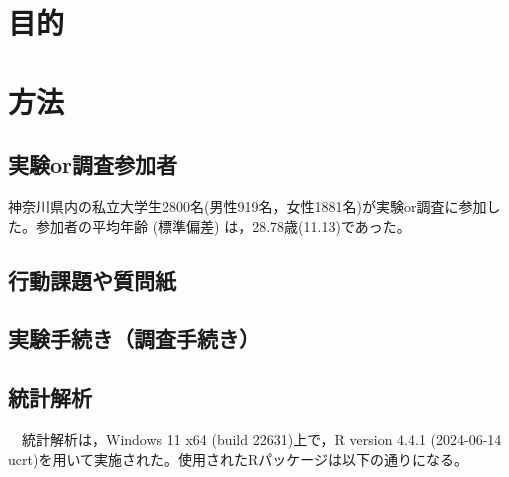 \documentclass[12pt,a4paper,xelatex,ja=standard]{bxjsarticle}
\begin{document}
\section{目的}\label{ux76eeux7684}

\clearpage

\section{方法}\label{ux65b9ux6cd5}

\subsection{実験or調査参加者}\label{ux5b9fux9a13orux8abfux67fbux53c2ux52a0ux8005}

神奈川県内の私立大学生2800名(男性919名，女性1881名)が実験or調査に参加した。参加者の平均年齢
(標準偏差) は，28.78歳(11.13)であった。

\subsection{行動課題や質問紙}\label{ux884cux52d5ux8ab2ux984cux3084ux8ceaux554fux7d19}

\subsection{実験手続き（調査手続き）}\label{ux5b9fux9a13ux624bux7d9aux304dux8abfux67fbux624bux7d9aux304d}

\subsection{統計解析}\label{ux7d71ux8a08ux89e3ux6790}

　統計解析は，Windows 11 x64 (build 22631)上で，R version 4.4.1
(2024-06-14
ucrt)を用いて実施された。使用されたRパッケージは以下の通りになる。
\end{document}
